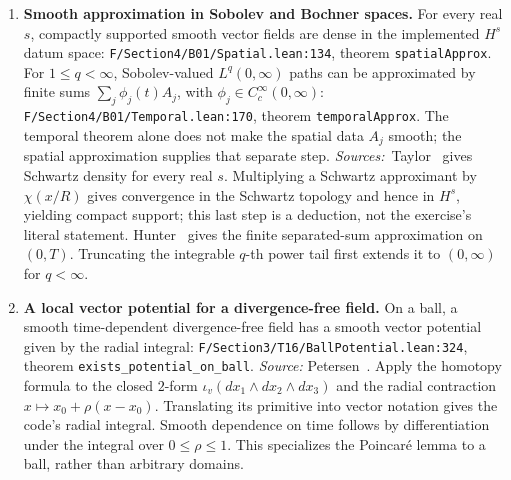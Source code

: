 \documentclass[11pt,a4paper]{article}
\newcommand{\code}[1]{\nolinkurl{#1}}
\newcommand{\source}[4]{\code{#1.lean:#2}, #4 \code{#3}}
\begin{document}
\begin{enumerate}[leftmargin=*,itemsep=5pt]
\item \textbf{Smooth approximation in Sobolev and Bochner spaces.}
For every real $s$, compactly supported smooth vector fields are dense in the
implemented $H^s$ datum space:
\source{F/Section4/B01/Spatial}{134}{spatialApprox}{theorem}.
For $1\le q<\infty$, Sobolev-valued $L^q(0,\infty)$ paths can be approximated
by finite sums $\sum_j\phi_j(t)A_j$, with $\phi_j\in C_c^\infty(0,\infty)$:
\source{F/Section4/B01/Temporal}{170}{temporalApprox}{theorem}.
The temporal theorem alone does not make the spatial data $A_j$ smooth;
the spatial approximation supplies that separate step.
\emph{Sources:}~Taylor~\cite[Chapter~4, Section~1, Exercise~1,
author-chapter p.~5]{taylor} gives Schwartz density for every real $s$.
Multiplying a Schwartz approximant by $\chi(x/R)$ gives convergence in the
Schwartz topology and hence in $H^s$, yielding compact support; this last
step is a deduction, not the exercise's literal statement.
Hunter~\cite[Appendix~6.A, Proposition~6.29, p.~200]{hunter} gives the finite
separated-sum approximation on $(0,T)$. Truncating the integrable $q$-th
power tail first extends it to $(0,\infty)$ for $q<\infty$.

\item \textbf{A local vector potential for a divergence-free field.}
On a ball, a smooth time-dependent divergence-free field has a smooth vector
potential given by the radial integral:
\source{F/Section3/T16/BallPotential}{324}{exists_potential_on_ball}{theorem}.
\emph{Source:} Petersen~\cite[Section~7.1, Lemma~7.1.2, pp.~127--128,
and Lemma~7.1.5, p.~129]{petersen}. Apply the homotopy formula to the closed
$2$-form $\iota_v(dx_1\wedge dx_2\wedge dx_3)$ and the radial contraction
$x\mapsto x_0+\rho(x-x_0)$. Translating its primitive into vector notation
gives the code's radial integral. Smooth dependence on time follows by
differentiation under the integral over $0\le\rho\le1$. This specializes
the Poincar\'e lemma to a ball, rather than arbitrary domains.


\end{enumerate}
\end{document}
